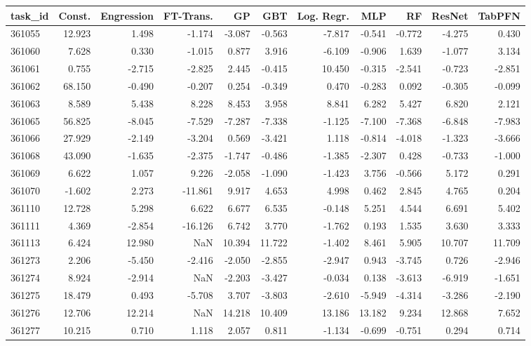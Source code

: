 \begin{tabular}{lrrrrrrrrrr}
\toprule
task\_id & Const. & Engression & FT-Trans. & GP & GBT & Log. Regr. & MLP & RF & ResNet & TabPFN \\
\midrule
361055 & 12.923 & 1.498 & -1.174 & -3.087 & -0.563 & -7.817 & -0.541 & -0.772 & -4.275 & 0.430 \\
361060 & 7.628 & 0.330 & -1.015 & 0.877 & 3.916 & -6.109 & -0.906 & 1.639 & -1.077 & 3.134 \\
361061 & 0.755 & -2.715 & -2.825 & 2.445 & -0.415 & 10.450 & -0.315 & -2.541 & -0.723 & -2.851 \\
361062 & 68.150 & -0.490 & -0.207 & 0.254 & -0.349 & 0.470 & -0.283 & 0.092 & -0.305 & -0.099 \\
361063 & 8.589 & 5.438 & 8.228 & 8.453 & 3.958 & 8.841 & 6.282 & 5.427 & 6.820 & 2.121 \\
361065 & 56.825 & -8.045 & -7.529 & -7.287 & -7.338 & -1.125 & -7.100 & -7.368 & -6.848 & -7.983 \\
361066 & 27.929 & -2.149 & -3.204 & 0.569 & -3.421 & 1.118 & -0.814 & -4.018 & -1.323 & -3.666 \\
361068 & 43.090 & -1.635 & -2.375 & -1.747 & -0.486 & -1.385 & -2.307 & 0.428 & -0.733 & -1.000 \\
361069 & 6.622 & 1.057 & 9.226 & -2.058 & -1.090 & -1.423 & 3.756 & -0.566 & 5.172 & 0.291 \\
361070 & -1.602 & 2.273 & -11.861 & 9.917 & 4.653 & 4.998 & 0.462 & 2.845 & 4.765 & 0.204 \\
361110 & 12.728 & 5.298 & 6.622 & 6.677 & 6.535 & -0.148 & 5.251 & 4.544 & 6.691 & 5.402 \\
361111 & 4.369 & -2.854 & -16.126 & 6.742 & 3.770 & -1.762 & 0.193 & 1.535 & 3.630 & 3.333 \\
361113 & 6.424 & 12.980 & NaN & 10.394 & 11.722 & -1.402 & 8.461 & 5.905 & 10.707 & 11.709 \\
361273 & 2.206 & -5.450 & -2.416 & -2.050 & -2.855 & -2.947 & 0.943 & -3.745 & 0.726 & -2.946 \\
361274 & 8.924 & -2.914 & NaN & -2.203 & -3.427 & -0.034 & 0.138 & -3.613 & -6.919 & -1.651 \\
361275 & 18.479 & 0.493 & -5.708 & 3.707 & -3.803 & -2.610 & -5.949 & -4.314 & -3.286 & -2.190 \\
361276 & 12.706 & 12.214 & NaN & 14.218 & 10.409 & 13.186 & 13.182 & 9.234 & 12.868 & 7.652 \\
361277 & 10.215 & 0.710 & 1.118 & 2.057 & 0.811 & -1.134 & -0.699 & -0.751 & 0.294 & 0.714 \\

\end{tabular}
